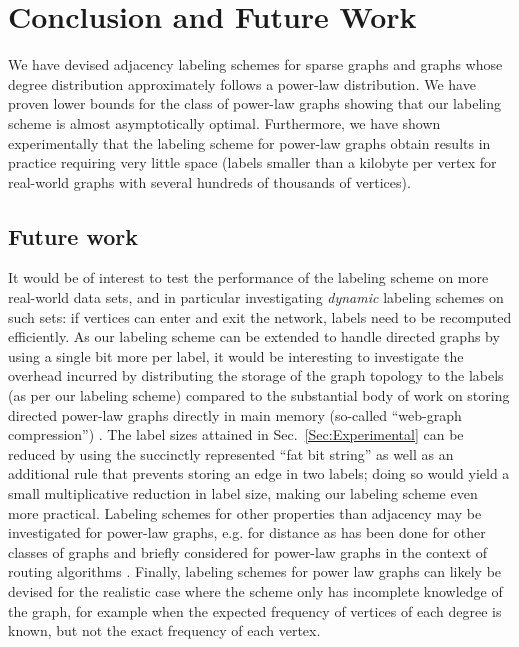 \documentclass{article}
\theoremstyle{remark}
\begin{document}
\section{Conclusion and Future Work}

We have devised adjacency labeling schemes for sparse graphs and graphs whose degree distribution approximately follows a power-law distribution. We have proven lower bounds for the class of power-law graphs showing that our labeling scheme is  almost asymptotically optimal. Furthermore, we have shown experimentally that the labeling scheme for power-law graphs obtain
results in practice requiring very little space (labels smaller than a kilobyte per vertex for real-world graphs with several hundreds of thousands of vertices).

\subsection{Future work}

It would be of interest to test the performance of the labeling scheme on more real-world data sets, and in particular investigating \emph{dynamic} labeling schemes on such sets: if vertices can enter and exit the network, labels need to be recomputed efficiently.
As our labeling scheme can be extended to handle directed graphs by using a single bit more per label, it would be interesting to investigate the overhead incurred by distributing the storage of the graph topology to the labels (as per our labeling scheme) compared to the substantial body of work on storing directed power-law graphs directly in main memory (so-called ``web-graph compression'') \cite{guillaume2002efficient,asano2003compact, asano2008efficient,claude2010fast}.
The  label sizes attained in Sec.~\ref{Sec:Experimental} can be reduced by using the succinctly represented ``fat bit string'' as well as an additional rule that prevents storing  an edge in two  labels; doing so would yield a small multiplicative reduction in label size, making our labeling scheme even more practical. 
Labeling schemes for other properties than adjacency may be investigated for power-law graphs, e.g. for distance as has been done for other classes of graphs \cite{alstrup2005labeling}
and briefly considered for power-law graphs in the context of routing algorithms \cite{chen2012compact}.
Finally, labeling schemes for power law graphs can likely be devised for the realistic case where the scheme only has incomplete knowledge of the graph, for example when the expected frequency of vertices of each degree is known, but not the exact frequency of each vertex.\newpage
 

\newpage
\appendix
\end{document}
